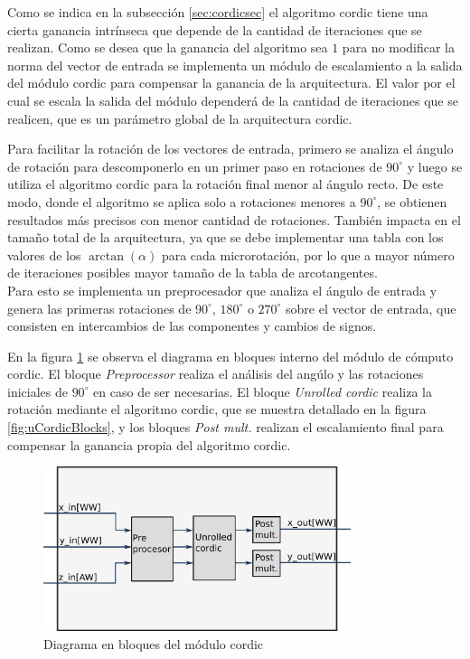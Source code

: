 Como se indica en la subsección \ref{sec:cordicsec} el algoritmo cordic tiene una cierta ganancia
intrínseca que depende de la cantidad de iteraciones que se realizan. Como se desea que la ganancia
del algoritmo sea $1$ para no modificar la norma del vector de entrada se implementa un módulo de
escalamiento a la salida del módulo cordic para compensar la ganancia de la arquitectura. El valor
por el cual se escala la salida del módulo dependerá de la cantidad de iteraciones que se realicen,
que es un parámetro global de la arquitectura cordic.

Para facilitar la rotación de los vectores de entrada, primero se analiza el ángulo de rotación para
descomponerlo en un primer paso en rotaciones de $90^\circ$ y luego se utiliza el algoritmo cordic para
la rotación final menor al ángulo recto. De este modo, donde el algoritmo se aplica solo a
rotaciones menores a $90^\circ$, se obtienen resultados más precisos con menor cantidad de rotaciones.
También impacta en el tamaño total de la arquitectura, ya que se debe implementar una tabla con los
valores de los $\arctan(\alpha)$ para cada microrotación, por lo que a mayor número de iteraciones
posibles mayor tamaño de la tabla de arcotangentes.\\
Para esto se implementa un preprocesador que analiza el ángulo de entrada y genera las primeras
rotaciones de $90^\circ$, $180^\circ$ o $270^\circ$ sobre el vector de entrada, que consisten en intercambios de
las componentes y cambios de signos.

En la figura \ref{fig:cordicBlocks} se observa el diagrama en bloques interno del módulo de cómputo
cordic. El bloque \textit{Preprocessor} realiza el análisis del angúlo y las rotaciones iniciales de
$90^\circ$ en caso de ser necesarias. El bloque \textit{Unrolled cordic} realiza la rotación mediante el
algoritmo cordic, que se muestra detallado en la figura \ref{fig:uCordicBlocks}, y los bloques
\textit{Post mult.} realizan el escalamiento final para compensar la ganancia propia del algoritmo cordic.

\begin{figure}[htb!]
        \centering
        \includegraphics[width=9cm]{./figures/cordicBlocks.png}
        \caption{Diagrama en bloques del módulo cordic}
        \label{fig:cordicBlocks}
\end{figure}

